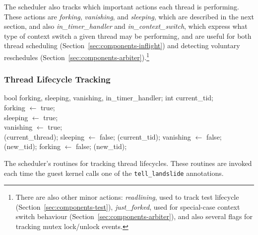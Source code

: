 The scheduler also tracks which important actions each thread is performing. These actions are {\em forking}, {\em vanishing}, and {\em sleeping}, which are described in the next section, and also {\em in\_timer\_handler} and {\em in\_context\_switch}, which express what type of context switch a given thread may be performing, and are useful for both thread scheduling (Section~\ref{sec:components-inflight}) and detecting voluntary reschedules (Section~\ref{sec:components-arbiter}).\footnote{
There are also other minor actions: {\em readlining}, used to track test lifecycle (Section~\ref{sec:components-test}), {\em just\_forked}, used for special-case context switch behaviour (Section~\ref{sec:components-arbiter}), and also several flags for tracking mutex lock/unlock events.}

\subsubsection{Thread Lifecycle Tracking}

\begin{algorithm}[t]
	\footnotesize
	\begin{algorithmic}
		\State bool forking, sleeping, vanishing, in\_timer\_handler;
		\State int current\_tid;
		\\
			\State forking $\gets$ true;
		\EndFunction
		\\
			\State sleeping $\gets$ true;
		\EndFunction
		\\
			\State vanishing $\gets$ true;
		\EndFunction
		\\
					(current\_thread);
					\State sleeping $\gets$ false;
					(current\_tid);
					\State vanishing $\gets$ false;
					(new\_tid);
					\State forking $\gets$ false;
				\EndIf
			\EndIf
			(new\_tid);
		\EndFunction
	\end{algorithmic}
	\caption{The scheduler's routines for tracking thread lifecycles. These routines are invoked each time the guest kernel calls one of the \texttt{tell\_landslide} annotations.}
	\label{alg:tell-landslide}
\end{algorithm}

